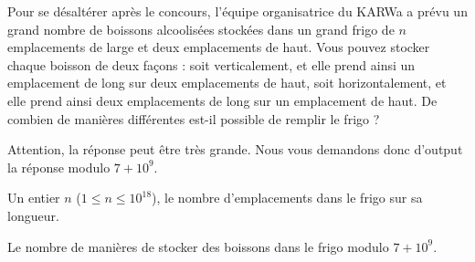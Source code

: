 \problemname{\problemyamlname}


Pour se désaltérer après le concours, l'équipe organisatrice du KARWa a prévu un grand
nombre de boissons alcoolisées stockées dans un grand frigo de $n$ emplacements
de large et deux emplacements de haut. Vous pouvez stocker chaque boisson de
deux façons : soit verticalement, et elle prend ainsi un emplacement de long sur
deux emplacements de haut, soit horizontalement, et elle prend ainsi deux
emplacements de long sur un emplacement de haut. De combien de manières
différentes est-il possible de remplir le frigo ?

Attention, la réponse peut être très grande. Nous vous demandons donc d'output
la réponse modulo $7+10^9$.

\begin{Input}
	Un entier $n$ ($1 \le n \le 10^{18}$), le nombre d'emplacements dans le frigo sur sa longueur.
\end{Input}

\begin{Output}
	Le nombre de manières de stocker des boissons dans le frigo modulo $7+10^9$.
\end{Output}
